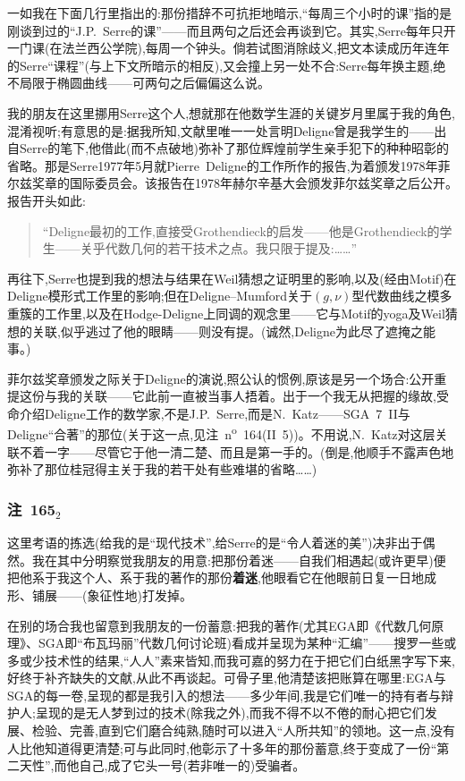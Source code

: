 一如我在下面几行里指出的:那份措辞不可抗拒地暗示,“每周三个小时的课”指的是刚谈到过的“J.P.~Serre的课”——而且两句之后还会再谈到它。其实,Serre每年只开一门课(在法兰西公学院),每周一个钟头。倘若试图消除歧义,把文本读成历年连年的Serre“课程”(与上下文所暗示的相反),又会撞上另一处不合:Serre每年换主题,绝不局限于椭圆曲线——可两句之后偏偏这么说。

我的朋友在这里挪用Serre这个人,想就那在他数学生涯的关键岁月里属于我的角色,混淆视听;有意思的是:据我所知,文献里唯一一处言明Deligne曾是我学生的——出自Serre的笔下,他借此(而不点破地)弥补了那位辉煌前学生亲手犯下的种种昭彰的省略。那是Serre1977年5月就Pierre~Deligne的工作所作的报告,为着颁发1978年菲尔兹奖章的国际委员会。该报告在1978年赫尔辛基大会颁发菲尔兹奖章之后公开。报告开头如此:

\begin{quote}
“Deligne最初的工作,直接受Grothendieck的启发——他是Grothendieck的学生——关乎代数几何的若干技术之点。我只限于提及:……”
\end{quote}

\dmark{}再往下,Serre也提到我的想法与结果在Weil猜想之证明里的影响,以及(经由Motif)在Deligne模形式工作里的影响;但在Deligne--Mumford关于$(g,\nu)$型代数曲线之模多重簇的工作里,以及在Hodge-Deligne上同调的观念里——它与Motif的yoga及Weil猜想的关联,似乎逃过了他的眼睛——则没有提。(诚然,Deligne为此尽了遮掩之能事。)

菲尔兹奖章颁发之际关于Deligne的演说,照公认的惯例,原该是另一个场合:公开重提这份与我的关联——它此前一直被当事人捂着。出于一个我无从把握的缘故,受命介绍Deligne工作的数学家,不是J.P.~Serre,而是N.~Katz——SGA~7~II与Deligne“合著”的那位(关于这一点,见注~n\textsuperscript{o}~164(II~5))。不用说,N.~Katz对这层关联不着一字——尽管它于他一清二楚、而且是第一手的。(倒是,他顺手不露声色地弥补了那位桂冠得主关于我的若干处有些难堪的省略……)

\subsubsection*{注~165$_{2}$}

这里考语的拣选(给我的是“现代技术”,给Serre的是“令人着迷的美”)决非出于偶然。我在其中分明察觉我朋友的用意:把那份着迷——自我们相遇起(或许更早)便把他系于我这个人、系于我的著作的那份\textbf{着迷},他眼看它在他眼前日复一日地成形、铺展——(象征性地)打发掉。

在别的场合我也留意到我朋友的一份蓄意:把我的著作(尤其EGA即《代数几何原理》、SGA即“布瓦玛丽”代数几何讨论班)看成并呈现为某种“汇编”——搜罗一些或多或少技术性的结果,“人人”素来皆知,而我可嘉的努力在于把它们白纸黑字写下来,好终于补齐缺失的文献,从此不再谈起。可骨子里,他清楚该把账算在哪里:EGA与SGA的每一卷,呈现的都是我引入的想法——多少年间,我是它们唯一的持有者与辩护人;呈现的是无人梦到过的技术(除我之外),而我不得不以不倦的耐心把它们发展、检验、完善,直到它们磨合纯熟,随时可以进入“人所共知”的领地。这一点,没有人比他知道得更清楚;可与此同时,他彰示了十多年的那份蓄意\dmark{},终于变成了一份“第二天性”,而他自己,成了它头一号(若非唯一的)受骗者。


